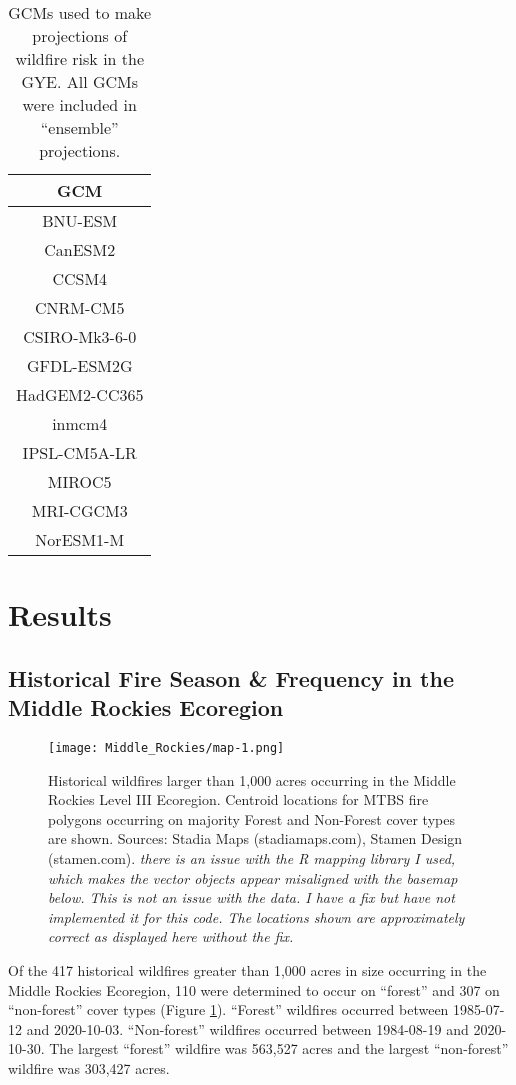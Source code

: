 \documentclass[11pt]{article}
\begin{document}
\begin{table}[h!]
  \centering
  \begin{tabular}{ c }
    \hline
    GCM \\
    \hline
    BNU-ESM \\
    CanESM2 \\
    CCSM4 \\
    CNRM-CM5 \\
    CSIRO-Mk3-6-0 \\
    GFDL-ESM2G \\
    HadGEM2-CC365 \\
    inmcm4 \\
    IPSL-CM5A-LR \\
    MIROC5 \\
    MRI-CGCM3 \\
    NorESM1-M \\
    \hline
  \end{tabular}
  \caption{GCMs used to make projections of wildfire risk in the GYE.  All GCMs were included in ``ensemble'' projections.}
  \label{table:gcms}
\end{table}

\section{Results}

\subsection{Historical Fire Season \& Frequency in the Middle Rockies Ecoregion}

\begin{figure}[ht]
  \texttt{[image: Middle\_Rockies/map-1.png]}
  \caption{Historical wildfires larger than 1,000 acres occurring in the Middle Rockies Level III Ecoregion.  Centroid locations for MTBS fire polygons occurring on majority Forest and Non-Forest cover types are shown.  Sources: Stadia Maps (stadiamaps.com), Stamen Design (stamen.com). \textit{there is an issue with the R mapping library I used, which makes the vector objects appear misaligned with the basemap below.  This is not an issue with the data. I have a fix but have not implemented it for this code.  The locations shown are approximately correct as displayed here without the fix.}}
  \label{fig:map}
\end{figure}

Of the 417 historical wildfires greater than 1,000 acres in size occurring in the Middle Rockies Ecoregion, 110 were determined to occur on ``forest'' and 307 on ``non-forest'' cover types (Figure \ref{fig:map}).  ``Forest'' wildfires occurred between 1985-07-12 and 2020-10-03.  ``Non-forest'' wildfires occurred between 1984-08-19 and 2020-10-30.  The largest ``forest'' wildfire was 563,527 acres and the largest ``non-forest'' wildfire was 303,427 acres.
\end{document}
